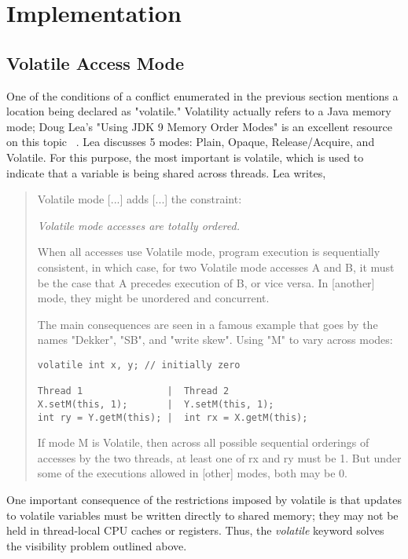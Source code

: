 \section{Implementation}

\subsection{Volatile Access Mode}
One of the conditions of a conflict enumerated in the previous section mentions a location being declared 
as "volatile." Volatility actually refers to a Java memory mode; Doug Lea's "Using JDK 9 Memory Order Modes" is an excellent resource 
on this topic ~\cite{waldspurger02}. Lea discusses 5 modes: Plain, Opaque, Release/Acquire, and Volatile. For this purpose, the 
most important is volatile, which is used to indicate that a variable is being shared across threads. Lea writes, 

\begin{quote}
Volatile mode [...] adds [...] the constraint:

\emph{Volatile mode accesses are totally ordered.}

When all accesses use Volatile mode, program execution is sequentially consistent, in which case, for two Volatile mode accesses A and B, it must be the case that A precedes execution of B, or vice versa. 
In [another] mode, they might be unordered and concurrent. 

The main consequences are seen in a famous example that goes by the names "Dekker", "SB", and "write skew". Using "M" to vary across modes:

\begin{verbatim} 
volatile int x, y; // initially zero

Thread 1               |  Thread 2
X.setM(this, 1);       |  Y.setM(this, 1);
int ry = Y.getM(this); |  int rx = X.getM(this);
\end{verbatim}
  
If mode M is Volatile, then across all possible sequential orderings of accesses by the two threads, at least one of rx and ry must be 1. But under some of the executions allowed in [other] modes, both may be 0. ~\cite{waldspurger02}
\end{quote}

\noindent
One important consequence of the restrictions imposed by volatile is that updates to volatile variables must be written directly to shared memory;
they may not be held in thread-local CPU caches or registers. Thus, the \emph{volatile} keyword solves the visibility problem outlined above. 

